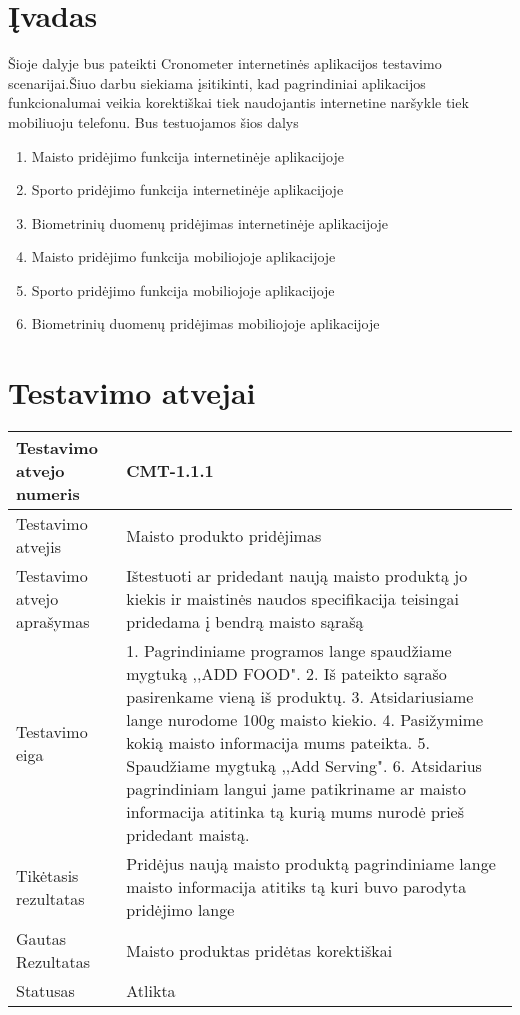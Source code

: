\documentclass[oneside]{VUMIFPSkursinis}
\begin{document}
\section{Įvadas}
Šioje dalyje bus pateikti Cronometer internetinės aplikacijos testavimo scenarijai.Šiuo darbu siekiama įsitikinti, kad pagrindiniai aplikacijos funkcionalumai veikia korektiškai tiek naudojantis internetine naršykle tiek mobiliuoju telefonu. Bus testuojamos šios dalys
	\begin{enumerate}
		\item{Maisto pridėjimo funkcija internetinėje aplikacijoje}
		\item{Sporto pridėjimo funkcija internetinėje aplikacijoje}
		\item{Biometrinių duomenų pridėjimas internetinėje aplikacijoje}
		\item{Maisto pridėjimo funkcija mobiliojoje aplikacijoje}
		\item{Sporto pridėjimo funkcija mobiliojoje aplikacijoje}
		\item{Biometrinių duomenų pridėjimas mobiliojoje aplikacijoje}
	\end{enumerate}

\section{Testavimo atvejai}

\iffalse XXXXXXXXXXXXXXXXXXXXXXXXXXXXXXXXXXXXXXXXXXXXXXXXXXXXXXXXXXXXXXXXXXXXXXXXXXXXXXXXXXXXXXXXXXXXXXXXXXXXXXXXXXXXXXXXXXXXXXXXXXXXXXXXXXXXXXX \fi
\begin{center}
    \begin{tabular}{ |p{5cm}|p{13cm}|}
    \hline
    	Testavimo atvejo numeris & CMT-1.1.1\\ \hline
    	Testavimo atvejis & Maisto produkto pridėjimas \\ \hline
	Testavimo atvejo aprašymas & Ištestuoti ar pridedant naują maisto produktą jo kiekis ir maistinės naudos specifikacija teisingai pridedama į bendrą maisto sąrašą   \\ \hline
	Testavimo eiga &1. Pagrindiniame programos lange spaudžiame mygtuką ,,ADD FOOD". 
				2. Iš pateikto sąrašo pasirenkame vieną iš produktų. 
				3. Atsidariusiame lange nurodome 100g maisto kiekio.
				4. Pasižymime kokią maisto informacija mums pateikta. 
				5. Spaudžiame mygtuką ,,Add Serving".
				6. Atsidarius pagrindiniam langui jame patikriname ar maisto informacija atitinka tą kurią mums nurodė prieš pridedant maistą.\\ \hline
	Tikėtasis rezultatas &  Pridėjus naują maisto produktą pagrindiniame lange maisto informacija atitiks tą kuri buvo parodyta pridėjimo lange\\ \hline
	Gautas Rezultatas & Maisto produktas pridėtas korektiškai  \\ \hline
	Statusas &  Atlikta\\ \hline
    \hline
    \end{tabular}
\end{center}
\end{document}

